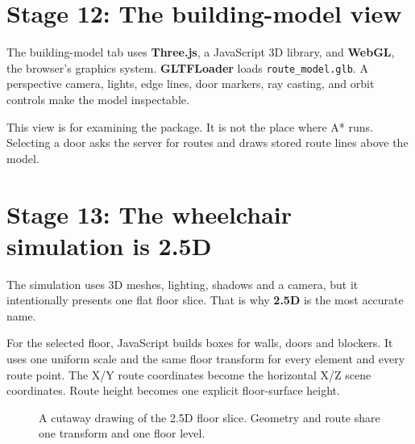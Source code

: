 \documentclass[11pt,a4paper]{article}
\newcommand{\term}[1]{\textbf{#1}}
\newcommand{\code}[1]{\texttt{#1}}
\begin{document}
\section{Stage 12: The building-model view}
The building-model tab uses \term{Three.js}, a JavaScript 3D library, and \term{WebGL}, the browser's graphics system. \term{GLTFLoader} loads \code{route\_model.glb}. A perspective camera, lights, edge lines, door markers, ray casting, and orbit controls make the model inspectable.

This view is for examining the package. It is not the place where A* runs. Selecting a door asks the server for routes and draws stored route lines above the model.

\section{Stage 13: The wheelchair simulation is 2.5D}
The simulation uses 3D meshes, lighting, shadows and a camera, but it intentionally presents one flat floor slice. That is why \term{2.5D} is the most accurate name.

For the selected floor, JavaScript builds boxes for walls, doors and blockers. It uses one uniform scale and the same floor transform for every element and every route point. The X/Y route coordinates become the horizontal X/Z scene coordinates. Route height becomes one explicit floor-surface height.

\begin{figure}[H]\centering
{}
\caption{A cutaway drawing of the 2.5D floor slice. Geometry and route share one transform and one floor level.}
\end{figure}
\end{document}
